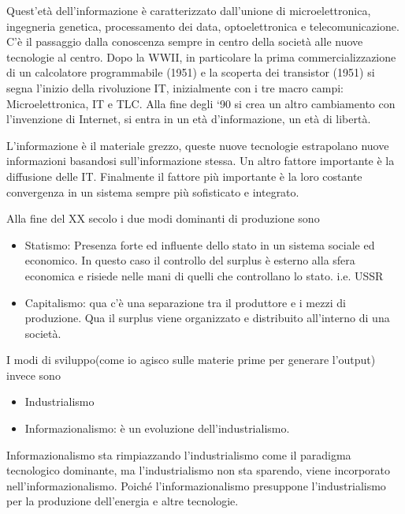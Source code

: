 \documentclass[]{article}
\begin{document}
Quest'età dell'informazione è caratterizzato dall'unione di
microelettronica, ingegneria genetica, processamento dei data,
optoelettronica e telecomunicazione. C'è il passaggio dalla conoscenza
sempre in centro della società alle nuove tecnologie al centro. Dopo la
WWII, in particolare la prima commercializzazione di un calcolatore
programmabile (1951) e la scoperta dei transistor (1951) si segna
l'inizio della rivoluzione IT, inizialmente con i tre macro campi:
Microelettronica, IT e TLC. Alla fine degli `90 si crea un altro
cambiamento con l'invenzione di Internet, si entra in un età
d'informazione, un età di libertà.

L'informazione è il materiale grezzo, queste nuove tecnologie
estrapolano nuove informazioni basandosi sull'informazione stessa. Un
altro fattore importante è la diffusione delle IT. Finalmente il fattore
più importante è la loro costante convergenza in un sistema sempre più
sofisticato e integrato.

Alla fine del XX secolo i due modi dominanti di produzione sono

\begin{itemize}
	 
	\item
	Statismo: Presenza forte ed influente dello stato in un sistema
	sociale ed economico. In questo caso il controllo del surplus è
	esterno alla sfera economica e risiede nelle mani di quelli che
	controllano lo stato. i.e. USSR
	\item
	Capitalismo: qua c'è una separazione tra il produttore e i mezzi di
	produzione. Qua il surplus viene organizzato e distribuito all'interno
	di una società.
\end{itemize}

I modi di sviluppo(come io agisco sulle materie prime per generare
l'output) invece sono

\begin{itemize}
	 
	\item
	Industrialismo
	\item
	Informazionalismo: è un evoluzione dell'industrialismo.
\end{itemize}

Informazionalismo sta rimpiazzando l'industrialismo come il paradigma
tecnologico dominante, ma l'industrialismo non sta sparendo, viene
incorporato nell'informazionalismo. Poiché l'informazionalismo
presuppone l'industrialismo per la produzione dell'energia e altre
tecnologie.
\end{document}
